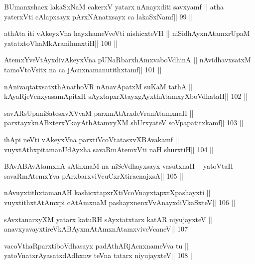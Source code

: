 \begin{shl}
BUmanxshacx lakaSxNaM cakerxV yatarx nAnayxditi savxyamf ||
atha yaterxVti cAlapxsayx pArxNAnatxsayx ca lakaSxNamf\hfill || 99 ||
\end{shl}

\begin{shl}
athAta iti vAkeyxVna hayxhameVveVti nishicxteVH ||
niSidhAyxnAtamxrUpaM yatatxtoV\s haMkAranihunxtiH\hfill || 100 ||
\end{shl}

\begin{shl}
AtemxYveVtAyxdivAkeyxVna pUNaRbarxhAmxvaboVdhinA ||
nAvidhavxsatxM tamoV\s toV\s sitx na ca jAcnxnamanutithxtamf\hfill || 101 ||
\end{shl}

\begin{shl}
nAnivaqtatxsatxthA\s nathoVR nAnavApatxM suKaM tathA ||
kAyaRjeVcnxyasamApitxH sAyxtapxrXtayxgAyxthAtamxyXboVdhataH\hfill || 102 ||
\end{shl}

\begin{shl}
savARsUpaniSatesxvXVvaM parxmAtArxdeVranAtamxnaH ||
parxtayxknABxterxYkayAthAtamxyXM shUrxyateV soVpapatitxkamf\hfill || 103 ||
\end{shl}

\begin{shl}
ihApi neVti vAkeyxVna parxtiVcoV\s tatasxvXBAvakamf ||
vuyxtAthxpitamanUdAyx\s\s ha savaRmAtemxVti naH shurxtiH\hfill || 104 ||
\end{shl}

\begin{shl}
BAvABAvAtamxnA sAthxnaM na niSeVdhayxsayx vasutxnaH ||
yatoV\s taH savaRmAtemxYva pArxbarxviVcuCxrXtiracnajxsA\hfill || 105 ||
\end{shl}

\begin{shl}
nAvuyxtithxtamanAH kashicxtapxrXtiVcoV\s nayxtapxrXpashayxti ||
vuyxtithxtAtAmx\s pi cA\s\s tAmxnaM pashayxnenxVvAnayxdiVkaSxteV\hfill || 106 ||
\end{shl}

\begin{shl}
sAvxtanarxyXM yatarx katuRH sAyxtatxtarx katAR niyujayxteV ||
anavxyavayxtireVkABAyxmAtAmxnAtamxviveVcaneV\hfill || 107 ||
\end{shl}

\begin{shl}
vacoVthaRparxtiboVdhasayx padAthARjAcnxnameVva tu ||
yatoV\s natxrAyasatxdAdhxnw teVna tatarx niyujayxteV\hfill || 108 ||
\end{shl}

